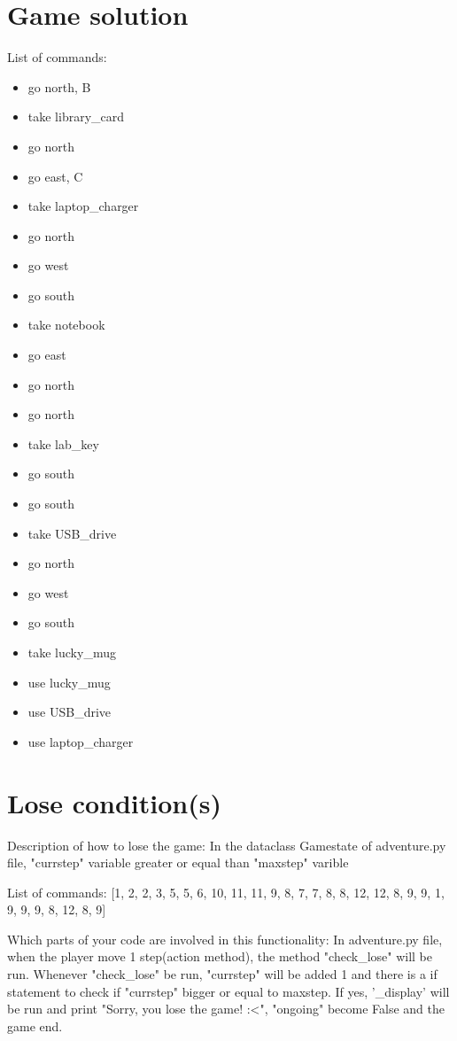 \documentclass[11pt]{article}
\begin{document}
\section*{Game solution}
List of commands:
\begin{itemize}
    \item go north, B
    \item take library\_card
    \item go north
    \item go east, C
    \item take laptop\_charger
    \item go north
    \item go west
    \item go south
    \item take notebook
    \item go east
    \item go north
    \item go north
    \item take lab\_key
    \item go south
    \item go south
    \item take USB\_drive
    \item go north
    \item go west
    \item go south
    \item take lucky\_mug
    \item use lucky\_mug
    \item use USB\_drive
    \item use laptop\_charger
\end{itemize}

\section*{Lose condition(s)}
Description of how to lose the game:
In the dataclass Gamestate of adventure.py file, "currstep" variable greater or equal than "maxstep" varible

List of commands:
[1, 2, 2, 3, 5, 5, 6, 10, 11, 11, 9, 8, 7, 7, 8, 8, 12, 12, 8, 9, 9, 1, 9, 9, 9, 8, 12, 8, 9]

Which parts of your code are involved in this functionality:
In adventure.py file, when the player move 1 step(action method), the method "check\_lose" will be run. Whenever  "check\_lose" be run,  "currstep" will be added 1 and there is a if statement to check if "currstep" bigger or equal to maxstep. If yes, '\_display' will be run and print "Sorry, you lose the game! :<", "ongoing" become False and the game end.
\end{document}
